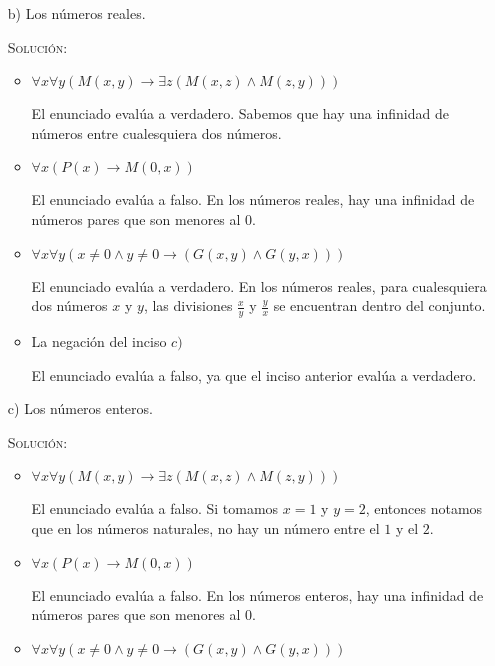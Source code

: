 \documentclass[letterpaper,11pt]{article}
\begin{document}
\begin{enumerate}
\begin{itemize}
        \item[b)] Los números reales.

        \textsc{Solución:}
        \begin{itemize}
            \item $∀x ∀y (M(x, y) → ∃z(M(x, z) \land M(z, y)))$

            El enunciado evalúa a verdadero. Sabemos que hay una infinidad de  
            números entre cualesquiera dos números.

            \item $∀x (P(x) → M(0, x))$

            El enunciado evalúa a falso. En los números reales, hay una infinidad 
            de números pares que son menores al $0$.

            \item $∀x ∀y (x \neq 0 \land y \neq 0 → (G(x, y) \land G(y, x)))$

            El enunciado evalúa a verdadero. En los números reales, para 
            cualesquiera dos números $x$ y $y$, las divisiones $\frac{x}{y}$ y 
            $\frac{y}{x}$ se encuentran dentro del conjunto. 

            \item La negación del inciso $c)$     
            
            El enunciado evalúa a falso, ya que el inciso anterior evalúa a 
            verdadero.
        \end{itemize}

        \item[c)] Los números enteros. 

        \textsc{Solución:}
        \begin{itemize}
            \item $∀x ∀y (M(x, y) → ∃z(M(x, z) \land M(z, y)))$

            El enunciado evalúa a falso. Si tomamos $x = 1$ y $y = 2$, entonces 
            notamos que en los números naturales, no hay un número entre el $1$
            y el $2$. 

            \item $∀x (P(x) → M(0, x))$

            El enunciado evalúa a falso. En los números enteros, hay una 
            infinidad de números pares que son menores al $0$.

            \item $∀x ∀y (x \neq 0 \land y \neq 0 → (G(x, y) \land G(y, x)))$


\end{itemize}
\end{itemize}
\end{enumerate}
\end{document}
